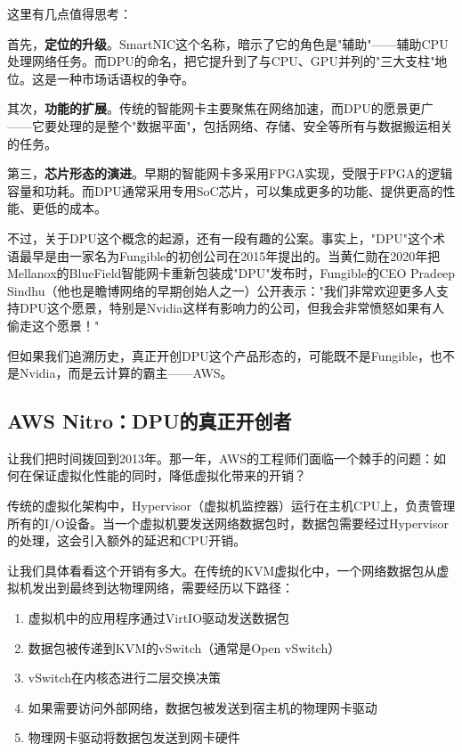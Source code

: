 这里有几点值得思考：

首先，\textbf{定位的升级}。SmartNIC这个名称，暗示了它的角色是"辅助"——辅助CPU处理网络任务。而DPU的命名，把它提升到了与CPU、GPU并列的"三大支柱"地位。这是一种市场话语权的争夺。

其次，\textbf{功能的扩展}。传统的智能网卡主要聚焦在网络加速，而DPU的愿景更广——它要处理的是整个"数据平面"，包括网络、存储、安全等所有与数据搬运相关的任务。

第三，\textbf{芯片形态的演进}。早期的智能网卡多采用FPGA实现，受限于FPGA的逻辑容量和功耗。而DPU通常采用专用SoC芯片，可以集成更多的功能、提供更高的性能、更低的成本。

不过，关于DPU这个概念的起源，还有一段有趣的公案。事实上，"DPU"这个术语最早是由一家名为Fungible的初创公司在2015年提出的。当黄仁勋在2020年把Mellanox的BlueField智能网卡重新包装成"DPU"发布时，Fungible的CEO Pradeep Sindhu（他也是瞻博网络的早期创始人之一）公开表示："我们非常欢迎更多人支持DPU这个愿景，特别是Nvidia这样有影响力的公司，但我会非常愤怒如果有人偷走这个愿景！"

但如果我们追溯历史，真正开创DPU这个产品形态的，可能既不是Fungible，也不是Nvidia，而是云计算的霸主——AWS。

\subsection{AWS Nitro：DPU的真正开创者}

让我们把时间拨回到2013年。那一年，AWS的工程师们面临一个棘手的问题：如何在保证虚拟化性能的同时，降低虚拟化带来的开销？

传统的虚拟化架构中，Hypervisor（虚拟机监控器）运行在主机CPU上，负责管理所有的I/O设备。当一个虚拟机要发送网络数据包时，数据包需要经过Hypervisor的处理，这会引入额外的延迟和CPU开销。

让我们具体看看这个开销有多大。在传统的KVM虚拟化中，一个网络数据包从虚拟机发出到最终到达物理网络，需要经历以下路径：

\begin{enumerate}
    \item 虚拟机中的应用程序通过VirtIO驱动发送数据包
    \item 数据包被传递到KVM的vSwitch（通常是Open vSwitch）
    \item vSwitch在内核态进行二层交换决策
    \item 如果需要访问外部网络，数据包被发送到宿主机的物理网卡驱动
    \item 物理网卡驱动将数据包发送到网卡硬件
\end{enumerate}


